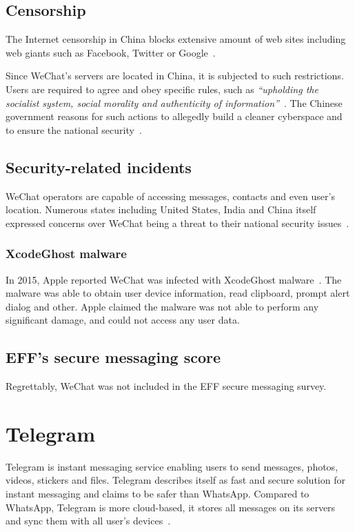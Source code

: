 \documentclass[thesis=M,english]{FITthesis}[2012/10/20]
\begin{document}
\subsection{Censorship}

The Internet censorship in China blocks extensive amount of web sites including web giants such as Facebook, Twitter or Google~\cite{china-twitter,china-facebook}.

Since WeChat's servers are located in China, it is subjected to such restrictions. Users are required to agree and obey specific rules, such as \emph{``upholding the socialist system, social morality and authenticity of information''}~\cite{china-imblocking}. The Chinese government reasons for such actions to allegedly build a cleaner cyberspace and to ensure the national security~\cite{china-blocking2}.

\subsection{Security-related incidents}

WeChat operators are capable of accessing messages, contacts and even user's location. Numerous states including United States, India and China itself expressed concerns over WeChat being a threat to their national security issues~\cite{wechat-states}.

\subsubsection{XcodeGhost malware}

In 2015, Apple reported WeChat was infected with XcodeGhost malware~\cite{wechat-xcodemalware}. The malware was able to obtain user device information, read clipboard, prompt alert dialog and other. Apple claimed the malware was not able to perform any significant damage, and could not access any user data.

\subsection{EFF's secure messaging score}

Regrettably, WeChat was not included in the EFF secure messaging survey.


\section{Telegram}

Telegram is instant messaging service enabling users to send messages, photos, videos, stickers and files. Telegram describes itself as fast and secure solution for instant messaging and claims to be safer than WhatsApp. Compared to WhatsApp, Telegram is more cloud-based, it stores all messages on its servers and sync them with all user's devices~\cite{telegramfaq}.
\end{document}
